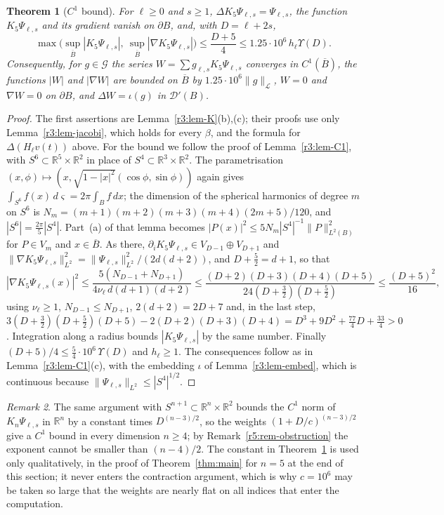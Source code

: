 \documentclass[11pt]{amsart}
\newtheorem{theorem}{Theorem}[section]
\theoremstyle{definition}
\theoremstyle{remark}
\newtheorem{remark}[theorem]{Remark}
\numberwithin{equation}{section}
\newcommand{\R}{\mathbb{R}}
\newcommand{\Gc}{\mathcal{G}}
\newcommand{\nrm}[1]{\lVert #1\rVert}
\begin{document}
\begin{theorem}[$C^1$ bound]\label{r5:thm-C1}
For $\ell\geq0$ and $s\geq1$, $\Delta K_5\Psi_{\ell,s}=\Psi_{\ell,s}$, the function $K_5\Psi_{\ell,s}$ and its gradient vanish on $\partial B$, and, with $D=\ell+2s$,
\[
\max\Big(\sup_{\overline B}|K_5\Psi_{\ell,s}|,\ \sup_{\overline B}|\nabla K_5\Psi_{\ell,s}|\Big)\leq\frac{D+5}4\leq1.25\cdot10^6\,h_\ell\Upsilon(D).
\]
Consequently, for $g\in\Gc$ the series $W=\sum g_{\ell,s}K_5\Psi_{\ell,s}$ converges in $C^1(\overline B)$, the functions $|W|$ and $|\nabla W|$ are bounded on $\overline B$ by $1.25\cdot10^6\nrm g_{\mathcal L}$, $W=0$ and $\nabla W=0$ on $\partial B$, and $\Delta W=\iota(g)$ in $\mathcal D'(B)$.
\end{theorem}

\begin{proof}
The first assertions are Lemma~\ref{r3:lem-K}(b),(c); their proofs use only Lemma~\ref{r3:lem-jacobi}, which holds for every $\beta$, and the formula for $\Delta(H_\ell v(t))$ above. For the bound we follow the proof of Lemma~\ref{r3:lem-C1}, with $S^6\subset\R^5\times\R^2$ in place of $S^4\subset\R^3\times\R^2$. The parametrisation $(x,\phi)\mapsto(x,\sqrt{1-|x|^2}(\cos\phi,\sin\phi))$ again gives $\int_{S^6}f(x)\,d\varsigma=2\pi\int_Bf\,dx$; the dimension of the spherical harmonics of degree $m$ on $S^6$ is $N_m=(m+1)(m+2)(m+3)(m+4)(2m+5)/120$, and $|S^6|=\frac{2\pi}5|S^4|$. Part~(a) of that lemma becomes $|P(x)|^2\leq5N_m|S^4|^{-1}\nrm P^2_{L^2(B)}$ for $P\in V_m$ and $x\in\overline B$. As there, $\partial_iK_5\Psi_{\ell,s}\in V_{D-1}\oplus V_{D+1}$ and $\nrm{\nabla K_5\Psi_{\ell,s}}^2_{L^2}=\nrm{\Psi_{\ell,s}}^2_{L^2}/(2d(d+2))$, and $D+\frac52=d+1$, so that
\[
|\nabla K_5\Psi_{\ell,s}(x)|^2\leq\frac{5(N_{D-1}+N_{D+1})}{4\nu_\ell\,d(d+1)(d+2)}\leq\frac{(D+2)(D+3)(D+4)(D+5)}{24(D+\frac32)(D+\frac52)}\leq\frac{(D+5)^2}{16},
\]
using $\nu_\ell\geq1$, $N_{D-1}\leq N_{D+1}$, $2(d+2)=2D+7$ and, in the last step, $3(D+\frac32)(D+\frac52)(D+5)-2(D+2)(D+3)(D+4)=D^3+9D^2+\frac{77}4D+\frac{33}4>0$. Integration along a radius bounds $|K_5\Psi_{\ell,s}|$ by the same number. Finally $(D+5)/4\leq\frac54\cdot10^6\,\Upsilon(D)$ and $h_\ell\geq1$. The consequences follow as in Lemma~\ref{r3:lem-C1}(c), with the embedding $\iota$ of Lemma~\ref{r3:lem-embed}, which is continuous because $\nrm{\Psi_{\ell,s}}_{L^2}\leq|S^4|^{1/2}$.
\end{proof}

\begin{remark}
The same argument with $S^{n+1}\subset\R^n\times\R^2$ bounds the $C^1$ norm of $K_n\Psi_{\ell,s}$ in $\R^n$ by a constant times $D^{(n-3)/2}$, so the weights $(1+D/c)^{(n-3)/2}$ give a $C^1$ bound in every dimension $n\geq4$; by Remark~\ref{r5:rem-obstruction} the exponent cannot be smaller than $(n-4)/2$. The constant in Theorem~\ref{r5:thm-C1} is used only qualitatively, in the proof of Theorem~\ref{thm:main} for $n=5$ at the end of this section; it never enters the contraction argument, which is why $c=10^6$ may be taken so large that the weights are nearly flat on all indices that enter the computation.
\end{remark}
\end{document}
